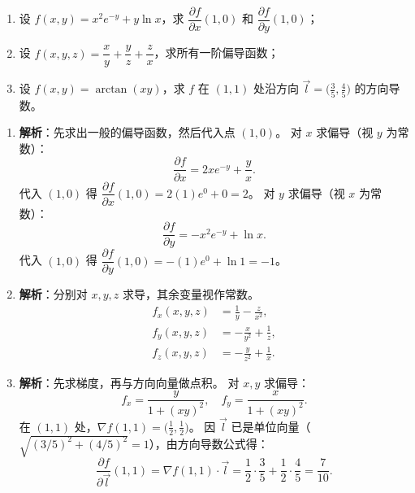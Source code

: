 \documentclass[lang=cn,11pt]{elegantbook}
\begin{document}
\begin{exercise}[方向导数与偏导数的计算]
\begin{enumerate}
  \item[(1)] 设 $f(x,y)=x^2e^{-y}+y\ln x$，求 $\dfrac{\partial f}{\partial x}(1,0)$ 和 $\dfrac{\partial f}{\partial y}(1,0)$；
  \item[(2)] 设 $f(x,y,z)=\dfrac{x}{y}+\dfrac{y}{z}+\dfrac{z}{x}$，求所有一阶偏导函数；
  \item[(3)] 设 $f(x,y)=\arctan(xy)$，求 $f$ 在 $(1,1)$ 处沿方向 $\vec l=\bigl(\frac35,\frac45\bigr)$ 的方向导数。
\end{enumerate}
\end{exercise}
\begin{solution}
\begin{enumerate}
  \item[(1)] \textbf{解析}：先求出一般的偏导函数，然后代入点 $(1,0)$。
  对 $x$ 求偏导（视 $y$ 为常数）：
  \[
  \frac{\partial f}{\partial x} = 2xe^{-y} + \frac{y}{x}.
  \]
  代入 $(1,0)$ 得 $\dfrac{\partial f}{\partial x}(1,0) = 2(1)e^0 + 0 = 2$。
  对 $y$ 求偏导（视 $x$ 为常数）：
  \[
  \frac{\partial f}{\partial y} = -x^2e^{-y} + \ln x.
  \]
  代入 $(1,0)$ 得 $\dfrac{\partial f}{\partial y}(1,0) = -(1)e^0 + \ln 1 = -1$。
  
  \item[(2)] \textbf{解析}：分别对 $x, y, z$ 求导，其余变量视作常数。
  \begin{align*}
  f_x(x,y,z) &= \frac{1}{y} - \frac{z}{x^2}, \\
  f_y(x,y,z) &= -\frac{x}{y^2} + \frac{1}{z}, \\
  f_z(x,y,z) &= -\frac{y}{z^2} + \frac{1}{x}.
  \end{align*}
  
  \item[(3)] \textbf{解析}：先求梯度，再与方向向量做点积。
  对 $x, y$ 求偏导：
  \[
  f_x = \frac{y}{1+(xy)^2}, \quad f_y = \frac{x}{1+(xy)^2}.
  \]
  在 $(1,1)$ 处，$\nabla f(1,1) = \bigl(\frac{1}{2}, \frac{1}{2}\bigr)$。
  因 $\vec l$ 已是单位向量（$\sqrt{(3/5)^2+(4/5)^2}=1$），由方向导数公式得：
  \[
  \frac{\partial f}{\partial \vec l}(1,1) = \nabla f(1,1) \cdot \vec l = \frac{1}{2} \cdot \frac{3}{5} + \frac{1}{2} \cdot \frac{4}{5} = \frac{7}{10}.
  \]
\end{enumerate}
\end{solution}
\end{document}
